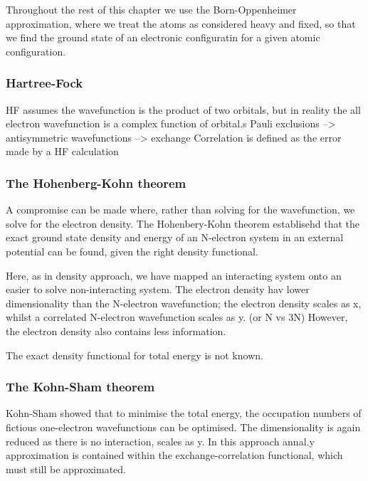 Throughout the rest of this chapter we use the Born-Oppenheimer approximation, where we treat the atoms as considered heavy and fixed, so that we find the ground state of an electronic configuratin for a given atomic configuration.



\subsubsection{Hartree-Fock}

HF assumes the wavefunction is the product of two orbitals, but in reality the all electron wavefunction is a complex function of orbital.s
Pauli exclusions --> antisymmetric wavefunctions --> exchange
Correlation is defined as the error made by a HF calculation

\subsubsection{The Hohenberg-Kohn theorem}

A compromise can be made where, rather than solving for the wavefunction, we solve for the electron density. 
The Hohenbery-Kohn theorem establisehd that the exact ground state density and energy of an N-electron system in an external potential can be found, given the right density functional. 

Here, as in density approach, we have mapped an interacting system onto an easier to solve non-interacting system.
The electron density  hav lower dimensionality than the N-electron wavefunction; the electron density scales as x, whilst a correlated N-electron wavefunction scales as y. (or N vs 3N) However, the electron density also contains less information.

The exact density functional for total energy is not known.


\subsubsection{The Kohn-Sham theorem}

Kohn-Sham showed that to minimise the total energy, the occupation numbers of fictious one-electron wavefunctions can be optimised. The dimensionality is again reduced as there is no interaction, scales as y. 
In this approach annal.y approximation is contained within the exchange-correlation functional, which must still be approximated.

